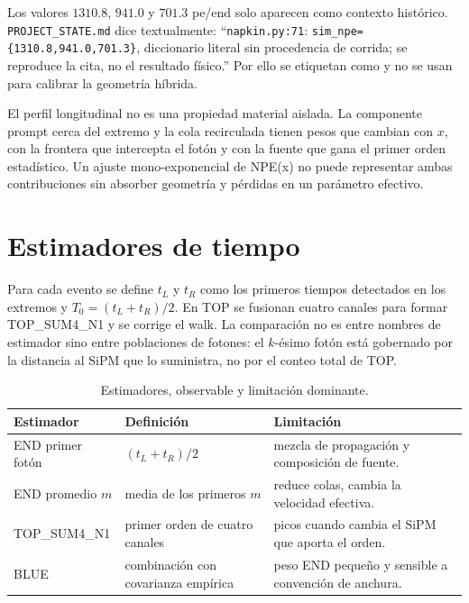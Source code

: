 Los valores $1310.8$, $941.0$ y $701.3$ pe/end solo aparecen como contexto histórico. \texttt{PROJECT\_STATE.md} dice textualmente: ``\texttt{napkin.py:71}: \texttt{sim\_npe=\{1310.8,941.0,701.3\}}, diccionario literal sin procedencia de corrida; se reproduce la cita, no el resultado físico.'' Por ello se etiquetan como \HistoricalNpeStatus{} y no se usan para calibrar la geometría híbrida.


El perfil longitudinal no es una propiedad material aislada. La componente prompt cerca del extremo y la cola recirculada tienen pesos que cambian con $x$, con la frontera que intercepta el fotón y con la fuente que gana el primer orden estadístico. Un ajuste mono-exponencial de NPE(x) no puede representar ambas contribuciones sin absorber geometría y pérdidas en un parámetro efectivo.

\chapter{Estimadores de tiempo}
Para cada evento se define $t_L$ y $t_R$ como los primeros tiempos detectados en los extremos y $T_0=(t_L+t_R)/2$. En TOP se fusionan cuatro canales para formar TOP\_SUM4\_N1 y se corrige el walk. La comparación no es entre nombres de estimador sino entre poblaciones de fotones: el $k$-ésimo fotón está gobernado por la distancia al SiPM que lo suministra, no por el conteo total de TOP.

\begin{table}[htbp]\centering\caption{Estimadores, observable y limitación dominante.}\begin{tabular}{p{}p{}p{}}\toprule Estimador & Definición & Limitación \\\midrule END primer fotón & $(t_L+t_R)/2$ & mezcla de propagación y composición de fuente.\\ END promedio $m$ & media de los primeros $m$ & reduce colas, cambia la velocidad efectiva.\\ TOP\_SUM4\_N1 & primer orden de cuatro canales & picos cuando cambia el SiPM que aporta el orden.\\ BLUE & combinación con covarianza empírica & peso END pequeño y sensible a convención de anchura.\\\bottomrule\end{tabular}\end{table}

